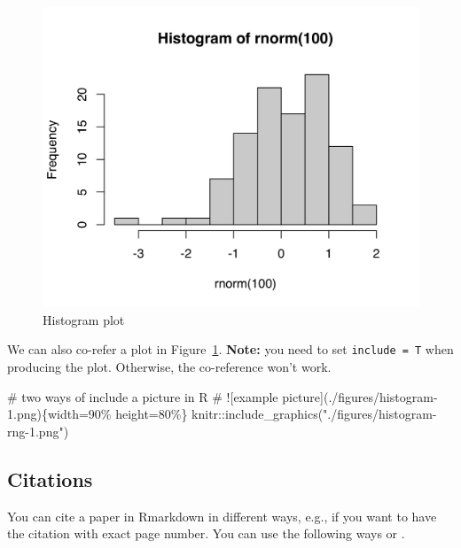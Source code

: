 \documentclass[
  letterpaper,
  DIV=11,
  numbers=noendperiod]{scrartcl}
\newenvironment{Shaded}{\begin{snugshade}}{\end{snugshade}}
\newcommand{\CommentTok}[1]{\textcolor[rgb]{0.37,0.37,0.37}{#1}}
\newcommand{\FunctionTok}[1]{\textcolor[rgb]{0.28,0.35,0.67}{#1}}
\newcommand{\NormalTok}[1]{\textcolor[rgb]{0.00,0.23,0.31}{#1}}
\newcommand{\SpecialCharTok}[1]{\textcolor[rgb]{0.37,0.37,0.37}{#1}}
\newcommand{\StringTok}[1]{\textcolor[rgb]{0.13,0.47,0.30}{#1}}
\begin{document}
\begin{figure}

{\centering \includegraphics{figures/fig-histogram-rng-1.png}

}

\caption{\label{fig-histogram-rng}Histogram plot}

\end{figure}

We can also co-refer a plot in Figure~\ref{fig-histogram-rng}.
\textbf{Note:} you need to set \texttt{include\ =\ T} when producing the
plot. Otherwise, the co-reference won't work.

\begin{Shaded}
\begin{Highlighting}[]
\CommentTok{\# two ways of include a picture in R}
\CommentTok{\# ![example picture](./figures/histogram{-}1.png)\{width=90\% height=80\%\}}
\NormalTok{knitr}\SpecialCharTok{::}\FunctionTok{include\_graphics}\NormalTok{(}\StringTok{"./figures/histogram{-}rng{-}1.png"}\NormalTok{)}
\end{Highlighting}
\end{Shaded}

\hypertarget{citations}{%
\subsection{Citations}\label{citations}}

You can cite a paper in Rmarkdown in different ways, e.g., if you want
to have the citation with exact page number. You can use the following
ways \autocite[see][p.45]{Jing2022} or \textcite[pp.~404]{Jing2022}.
\end{document}
